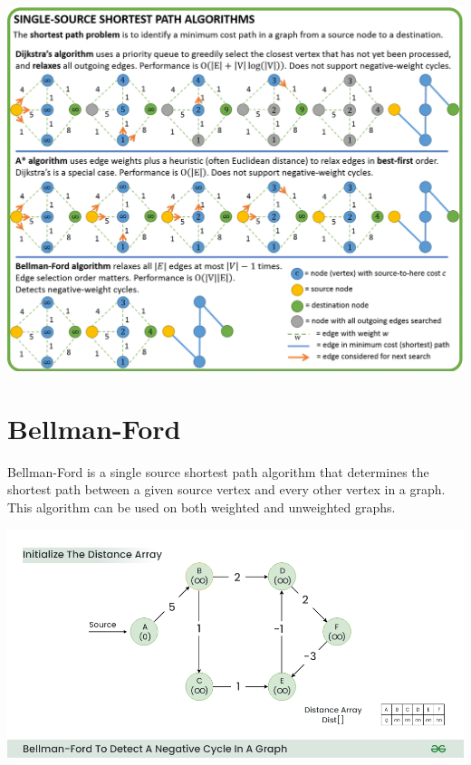\documentclass{article}
\begin{document}
\begin{multicols*}{2}
    \includegraphics[width=\linewidth]{paths.png}

    \section*{Bellman-Ford}
    Bellman-Ford is a single source shortest path algorithm that determines the
    shortest path between a given source vertex and every other vertex in a
    graph. This algorithm can be used on both weighted and unweighted graphs.

    \includegraphics[width=\linewidth]{bellman.png}


\end{multicols*}
\end{document}
